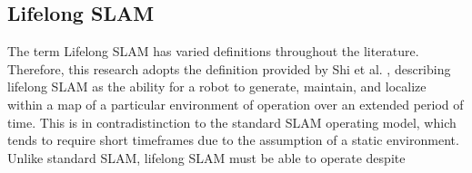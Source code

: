 \subsection{Lifelong SLAM}

The term Lifelong SLAM has varied definitions throughout the literature. Therefore, this research adopts the definition provided by Shi et al. \cite{shiAreWeReady2020}, describing lifelong SLAM as the ability for a robot to generate, maintain, and localize within a map of a particular environment of operation over an extended period of time. This is in contradistinction to the standard SLAM operating model, which tends to require short timeframes due to the assumption of a static environment. Unlike standard SLAM, lifelong SLAM must be able to operate despite 